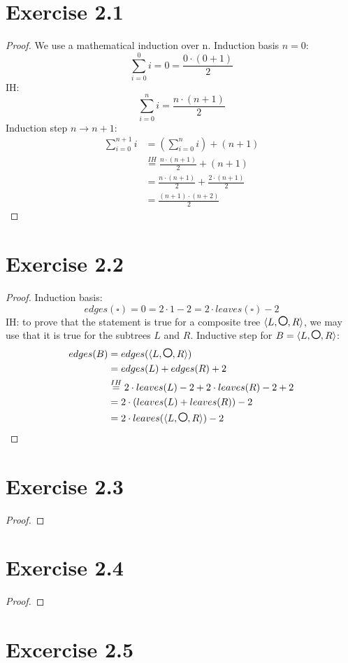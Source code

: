 \documentclass{article} %
\newcommand\Circle[1][1.5]{\tikz[baseline=-#1]{\draw[thick](0,0.1)circle[radius=#1mm];}}
\newcommand{\homeworkNumber}{2}
\begin{document}
\section*{Exercise \homeworkNumber.1}

\begin{proof}
We use a mathematical induction over n. \newline
Induction basis $n = 0$: 
\[ \sum_{i=0}^{0} i = 0 = \frac{0 \cdot(0+1)}{2} \]
IH: \[ \sum_{i=0}^{n} i = \frac{n \cdot (n+1)}{2}\]
Induction step $n \rightarrow n+1$:
\begin{align*}
\sum_{i=0}^{n+1} i & = \left( \sum_{i=0}^{n} i \right) + (n+1) \\
& \stackrel{IH}{=} \frac{n \cdot (n+1)}{2} + (n+1) \\
& = \frac{n \cdot (n+1)}{2} + \frac{2\cdot (n+1)}{2} \\
& = \frac{(n+1) \cdot (n+2)}{2}
\end{align*}
\end{proof}

\section*{Exercise \homeworkNumber.2}

\begin{proof}
Induction basis: \[ edges(\square) = 0 = 2 \cdot 1 - 2 = 2 \cdot leaves(\square) - 2 \]
IH: to prove that the statement is true for a composite tree $\langle L, \Circle ,R  \rangle$, we may use that it is true for the subtrees $L$ and $R$.\newline
Inductive step for $B = \langle L, \Circle ,R \rangle$:
\begin{align*}
edges(B) & = edges(\langle L, \Circle ,R \rangle) \\
& = edges(L) + edges(R) + 2 \\
& \stackrel{IH}{=} 2 \cdot leaves(L) - 2 + 2 \cdot leaves(R) - 2 + 2 \\
& = 2 \cdot (leaves(L) + leaves(R)) - 2 \\
& = 2 \cdot leaves(\langle L, \Circle ,R \rangle) - 2
\end{align*}
\end{proof}


\section*{Exercise \homeworkNumber.3}

\begin{proof}

\end{proof}

\section*{Exercise \homeworkNumber.4}

\begin{proof}
 
\end{proof}

\section*{Excercise \homeworkNumber.5}
\end{document}
